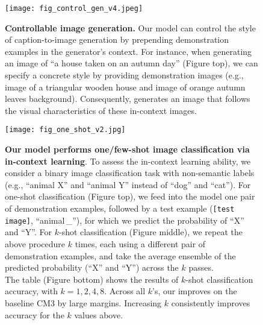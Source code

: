 \begin{figure}[!t]
\hspace{-3mm}
    \texttt{[image: fig\_control\_gen\_v4.jpeg]}\vspace{-3mm}
    \caption{\textbf{Controllable image generation.}
    Our \methodname model can control the style of caption-to-image generation by prepending demonstration examples in the generator's context. For instance, when generating an image of ``a house taken on an autumn day'' (Figure top), we can specify a concrete style by
    providing demonstration images (e.g., image of a triangular wooden house and image of orange autumn leaves background). Consequently, \methodname generates an image that follows the visual characteristics of these in-context images.
    }
    \label{fig:control_gen}
\end{figure}

\begin{figure}[!t]
    \centering
    \hspace{-2mm}\texttt{[image: fig\_one\_shot\_v2.jpg]}
    \vspace{-0mm}
    \begin{center}
    \setlength\tabcolsep{6pt}
    \end{center}
    \vspace{0mm}
    \caption{\textbf{Our model performs one/few-shot image classification via in-context learning}. 
    To assess the in-context learning ability, we consider a binary image classification task with non-semantic labels (e.g., ``animal X'' and ``animal Y'' instead of ``dog'' and ``cat''). 
    For one-shot classification (Figure top), we feed into the model one pair of demonstration examples, followed by a test example (\texttt{[test\,\,image]}, ``animal\,\_''), for which we predict the probability of ``X'' and ``Y''. 
    For $k$-shot classification (Figure middle), we repeat the above procedure $k$ times, each using a different pair of demonstration examples, and take the average ensemble of the predicted probability (``X'' and ``Y'') across the $k$ passes.\\[1mm]
    The table (Figure bottom) shows the results of $k$-shot classification accuracy, with $k=1,2,4,8$. Across all $k$'s, our \methodname improves on the baseline CM3 by large margins. Increasing $k$ consistently improves accuracy for the $k$ values above.
    }
    \label{fig:image_one_shot}
\end{figure}


